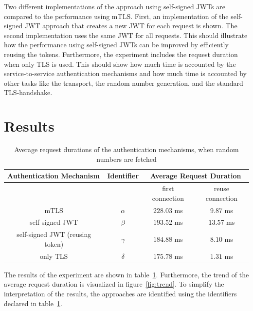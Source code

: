 Two different implementations of the approach using self-signed JWTs are compared to the performance using mTLS.
First, an implementation of the self-signed JWT approach that creates a new JWT for each request is shown.
The second implementation uses the same JWT for all requests.
This should illustrate how the performance using self-signed JWTs can be improved by efficiently reusing the tokens.
Furthermore, the experiment includes the request duration when only TLS is used.
This should show how much time is accounted by the service-to-service authentication mechanisms and how much time is accounted by other tasks like the transport, the random number generation, and the standard TLS-handshake.

\section{Results}

\begin{table}[H]
	\centering
\begin{tabular}{c|c|cc}
	\multicolumn{1}{l|}{\textbf{Authentication Mechanism}} & \textbf{Identifier} & \multicolumn{2}{c}{\textbf{Average Request Duration}} \\ \hline
	\multicolumn{1}{c|}{} & & \multicolumn{1}{c|}{first connection} & reuse connection \\ \hline
	mTLS & $\alpha$ & \multicolumn{1}{c|}{$228.03$ ms} & $9.87$ ms \\ \hline
	self-signed JWT & $\beta$ & \multicolumn{1}{c|}{$193.52$ ms} & $13.57$ ms \\ \hline
	self-signed JWT (reusing token) & $\gamma$ & \multicolumn{1}{c|}{$184.88$ ms} & $8.10$ ms \\ \hline 
	only TLS & $\delta$ & \multicolumn{1}{c|}{$175.78$ ms} & $1.31$ ms
\end{tabular}
\caption{Average request durations of the authentication mechanisms, when random numbers are fetched}
\label{tab:experiment_case_1}
\end{table}

The results of the experiment are shown in table~\ref{tab:experiment_case_1}.
Furthermore, the trend of the average request duration is visualized in figure~\ref{fig:trend}.
To simplify the interpretation of the results, the approaches are identified using the identifiers declared in table~\ref{tab:experiment_case_1}.

